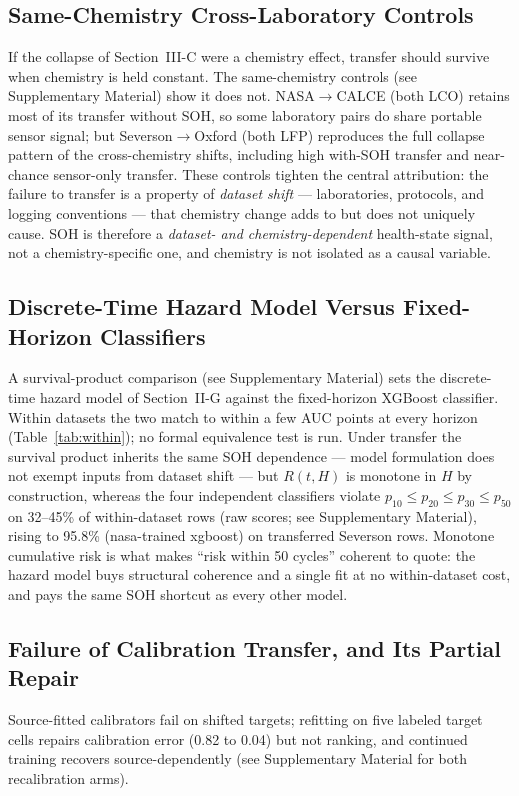 \documentclass[preprint,12pt]{elsarticle}
\begin{document}
\subsection{Same-Chemistry Cross-Laboratory Controls}
If the collapse of Section~III-C were a chemistry effect, transfer should survive when chemistry is held constant. The same-chemistry controls (see Supplementary Material) show it does not. NASA$\to$CALCE (both LCO) retains most of its transfer without SOH, so some laboratory pairs do share portable sensor signal; but Severson$\to$Oxford (both LFP) reproduces the full collapse pattern of the cross-chemistry shifts, including high with-SOH transfer and near-chance sensor-only transfer. These controls tighten the central attribution: the failure to transfer is a property of \emph{dataset shift} --- laboratories, protocols, and logging conventions --- that chemistry change adds to but does not uniquely cause. SOH is therefore a \emph{dataset- and chemistry-dependent} health-state signal, not a chemistry-specific one, and chemistry is not isolated as a causal variable.



\subsection{Discrete-Time Hazard Model Versus Fixed-Horizon Classifiers}
A survival-product comparison (see Supplementary Material) sets the discrete-time hazard model of Section~II-G against the fixed-horizon XGBoost classifier. Within datasets the two match to within a few AUC points at every horizon (Table~\ref{tab:within}); no formal equivalence test is run. Under transfer the survival product inherits the same SOH dependence --- model formulation does not exempt inputs from dataset shift --- but $R(t,H)$ is monotone in $H$ by construction, whereas the four independent classifiers violate $p_{10}\le p_{20}\le p_{30}\le p_{50}$ on 32--45\% of within-dataset rows (raw scores; see Supplementary Material), rising to 95.8\% (nasa-trained xgboost) on transferred Severson rows. Monotone cumulative risk is what makes ``risk within 50 cycles'' coherent to quote: the hazard model buys structural coherence and a single fit at no within-dataset cost, and pays the same SOH shortcut as every other model.





\subsection{Failure of Calibration Transfer, and Its Partial Repair}
Source-fitted calibrators fail on shifted targets; refitting on five labeled target cells repairs calibration error (0.82 to 0.04) but not ranking, and continued training recovers source-dependently (see Supplementary Material for both recalibration arms).
\end{document}
